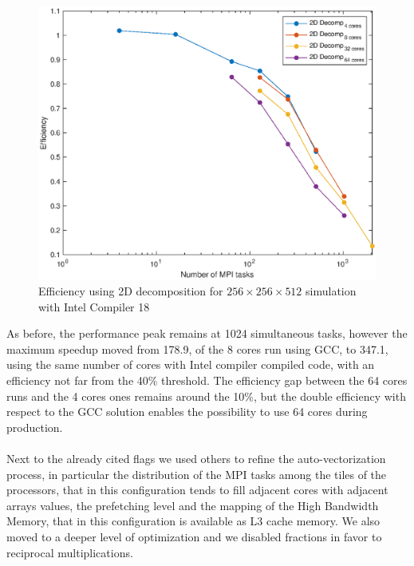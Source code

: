 \begin{figure}
\begin{center}
\includegraphics[scale=0.55]{grafici/intel_efficiency}
\caption{Efficiency using 2D decomposition for $256\times 256\times 512$ simulation with Intel Compiler 18}
\label{intel:efficiency}
\end{center}
\end{figure}

As before, the performance peak remains at 1024 simultaneous tasks, however the maximum speedup moved from 178.9, of the 8 cores run using GCC, to 347.1, using the same number of cores with Intel compiler compiled code, with an efficiency not far from the 40\% threshold.
The efficiency gap between the 64 cores runs and the 4 cores ones remains around the 10\%, but the double efficiency with respect to the GCC solution enables the possibility to use 64 cores during production.\\~\\

Next to the already cited flags we used others to refine the auto-vectorization process, in particular the distribution of the MPI tasks among the tiles of the processors, that in this configuration tends to fill adjacent cores with adjacent arrays values, the prefetching level and the mapping of the High Bandwidth Memory, that in this configuration is available as L3 cache memory.
We also moved to a deeper level of optimization and we disabled fractions in favor to reciprocal multiplications.\\~\\

